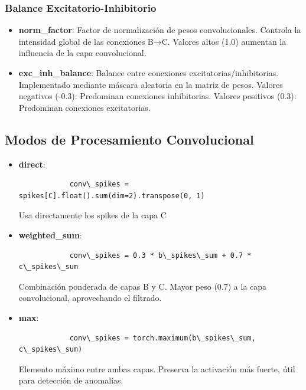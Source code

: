 \subsubsection{Balance Excitatorio-Inhibitorio}

\begin{itemize}
    \item \textbf{norm\_factor}: Factor de normalización de pesos convolucionales. Controla la intensidad global de las conexiones B→C. Valores altos (1.0) aumentan la influencia de la capa convolucional.
    \item \textbf{exc\_inh\_balance}: Balance entre conexiones excitatorias/inhibitorias. Implementado mediante máscara aleatoria en la matriz de pesos. Valores negativos (-0.3): Predominan conexiones inhibitorias. Valores positivos (0.3): Predominan conexiones excitatorias.
\end{itemize}

\subsection{Modos de Procesamiento Convolucional}







\begin{itemize}
    \item \textbf{direct}:
        \begin{lstlisting}
            conv\_spikes = spikes[C].float().sum(dim=2).transpose(0, 1)
        \end{lstlisting}
        
        Usa directamente los spikes de la capa C
    \item \textbf{weighted\_sum}:
        \begin{lstlisting}
            conv\_spikes = 0.3 * b\_spikes\_sum + 0.7 * c\_spikes\_sum
        \end{lstlisting}
        
        Combinación ponderada de capas B y C. Mayor peso (0.7) a la capa convolucional, aprovechando el filtrado.
    \item \textbf{max}:
        \begin{lstlisting}
            conv\_spikes = torch.maximum(b\_spikes\_sum, c\_spikes\_sum)
        \end{lstlisting}
        
        Elemento máximo entre ambas capas. Preserva la activación más fuerte, útil para detección de anomalías.
\end{itemize}


